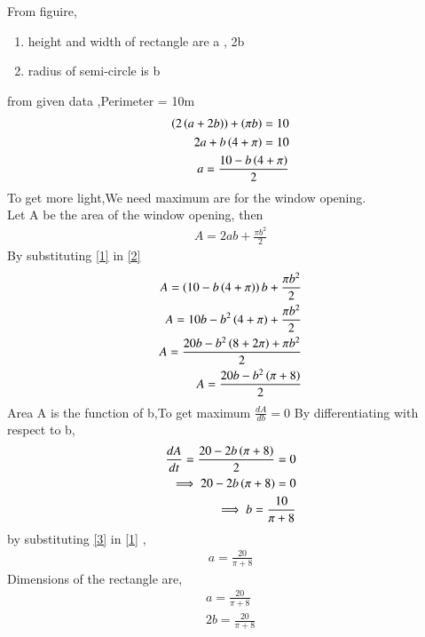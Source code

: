 \documentclass[journal]{IEEEtran}
\begin{document}
\begin{figure}[!ht]
\centering
{}%
\end{figure}
From figuire, 
\begin{enumerate}
\item height and width of rectangle are a , 2b
\item radius of semi-circle is b
\end{enumerate}
from given data ,Perimeter = 10m 
\begin{align}
\left(2\left(a+2b\right)\right) + \left(\pi b\right) = 10 \\
2a+b\left(4+ \pi\right) = 10 \\
a = \frac{10 - b\left(4+\pi\right)}{2} \label{1}
\end{align}
To get more light,We need maximum are for the window opening. \\
Let A be the area of the window opening, then \\
\begin{align}
A = 2ab + \frac{\pi b^2 }{2} \label{2}
\end{align}
By substituting \eqref{1} in \eqref{2}
\begin{align}
A = \left(10 - b\left(4+\pi\right)\right)b+\frac{\pi b^2}{2} \\ 
A = 10b - b^2 \left(4+\pi\right) + \frac{\pi b^2}{2} \\ 
A = \frac{20b - b^2 \left(8+2\pi\right) + \pi b^2}{2} \\
A = \frac{20b - b^2 \left(\pi +8\right)}{2} \label{4}
\end{align}
Area A is the function of b,To get maximum $\frac{dA}{db} = 0$
By differentiating with respect to b,
\begin{align}
\frac{dA}{dt} = \frac{20 - 2 b \left(\pi +8\right)}{2} = 0 \\
\implies 20 - 2b\left(\pi +8\right) = 0 \\ 
\implies b = \frac{10}{\pi +8} \label{3}
\end{align}
by substituting \eqref{3} in \eqref{1} , 
\begin{align}
a = \frac{20}{\pi +8}
\end{align}
Dimensions of the rectangle are, 
\begin{align}
a = \frac{20}{\pi +8} \\ 
2b = \frac{20}{\pi +8}
\end{align}
\end{document}
